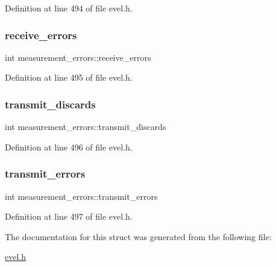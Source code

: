 Definition at line 494 of file evel.\+h.

\hypertarget{structmeasurement__errors_a3200690b34fb94800164e5fd043a5f36}{}\label{structmeasurement__errors_a3200690b34fb94800164e5fd043a5f36} 
\subsubsection{\texorpdfstring{receive\+\_\+errors}{receive\_errors}}
{\footnotesize\ttfamily int measurement\+\_\+errors\+::receive\+\_\+errors}



Definition at line 495 of file evel.\+h.

\hypertarget{structmeasurement__errors_a18f70f34aca47ed877e463921423448a}{}\label{structmeasurement__errors_a18f70f34aca47ed877e463921423448a} 
\subsubsection{\texorpdfstring{transmit\+\_\+discards}{transmit\_discards}}
{\footnotesize\ttfamily int measurement\+\_\+errors\+::transmit\+\_\+discards}



Definition at line 496 of file evel.\+h.

\hypertarget{structmeasurement__errors_a91eb1e19af0e34ecfe551b560f36a4d5}{}\label{structmeasurement__errors_a91eb1e19af0e34ecfe551b560f36a4d5} 
\subsubsection{\texorpdfstring{transmit\+\_\+errors}{transmit\_errors}}
{\footnotesize\ttfamily int measurement\+\_\+errors\+::transmit\+\_\+errors}



Definition at line 497 of file evel.\+h.



The documentation for this struct was generated from the following file\+:\begin{DoxyCompactItemize}
\item 
\hyperlink{evel_8h}{evel.\+h}\end{DoxyCompactItemize}
